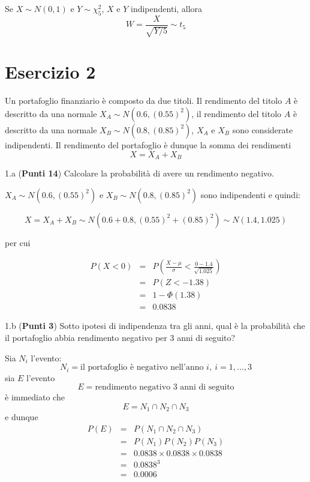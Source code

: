 \documentclass[
  11pt,
]{book}
\theoremstyle{mytheoremstyle}
\theoremstyle{mydefstyle}
\newenvironment{sol}
  {
  \begin{tcolorbox}[enhanced,breakable,arc=0.1mm,boxrule=1pt,colback=white,colframe=iblue,
  title=\bf \fontfamily{lmss}\selectfont \hspace{.5 cm} Soluzione,drop fuzzy shadow]

}{
\end{tcolorbox}
  }
\begin{document}
\begin{sol}
Se \(X\sim N(0,1)\) e \(Y\sim \chi^2_5\),
\(X\) e \(Y\) indipendenti, allora
\[W=\frac X {\sqrt{Y/5}} \sim t_5\]

\end{sol}

\section{Esercizio 2}\label{esercizio-2}

Un portafoglio finanziario è composto da due titoli. Il rendimento del titolo \(A\) è descritto da una normale \(X_A\sim N(0.6,(0.55)^2)\), il rendimento del titolo \(A\) è descritto da una normale \(X_B\sim N(0.8,(0.85)^2)\), \(X_A\) e \(X_B\) sono considerate indipendenti. Il rendimento del portafoglio è dunque la somma dei rendimenti
\[
X=X_A+X_B
\]

1.a (\textbf{Punti 14}) Calcolare la probabilità di avere un rendimento negativo.

\begin{sol}
\(X_A\sim N(0.6,(0.55)^2)\) e \(X_B\sim N(0.8,(0.85)^2)\) sono indipendenti e quindi:

\[
X=X_A+X_B\sim N(0.6+0.8,(0.55)^2+(0.85)^2)\sim N(1.4,1.025)
\]

per cui

\begin{eqnarray*}
      P( X   <   0 ) 
        &=& P\left(  \frac { X  -  \mu }{ \sigma }  <  \frac { 0  -  1.4 }{\sqrt{ 1.025 }} \right)  \\
                 &=& P\left(  Z   <   -1.38 \right) \\    
                 &=&  1-\Phi( 1.38 ) \\ &=&  0.0838 
      \end{eqnarray*}

\end{sol}

1.b (\textbf{Punti 3}) Sotto ipotesi di indipendenza tra gli anni, qual è la probabilità che il portafoglio abbia rendimento negativo per 3 anni di seguito?

\begin{sol}
Sia \(N_i\) l'evento:
\[
N_i = \text{il portafoglio è negativo nell'anno $i$}, \ i=1,...,3
\]
sia \(E\) l'evento
\[
E=\text{rendimento negativo 3 anni di seguito}
\]
è immediato che
\[
E=N_1\cap N_2\cap N_3 
\]
e dunque
\begin{eqnarray*}
P(E)&=&P(N_1\cap N_2\cap N_3 )\\
    &=&P(N_1)P(N_2)P(N_3)\\
    &=& 0.0838\times 0.0838\times 0.0838\\
    &=& 0.0838^3\\
    &=& 0.0006
\end{eqnarray*}

\end{sol}
\end{document}
